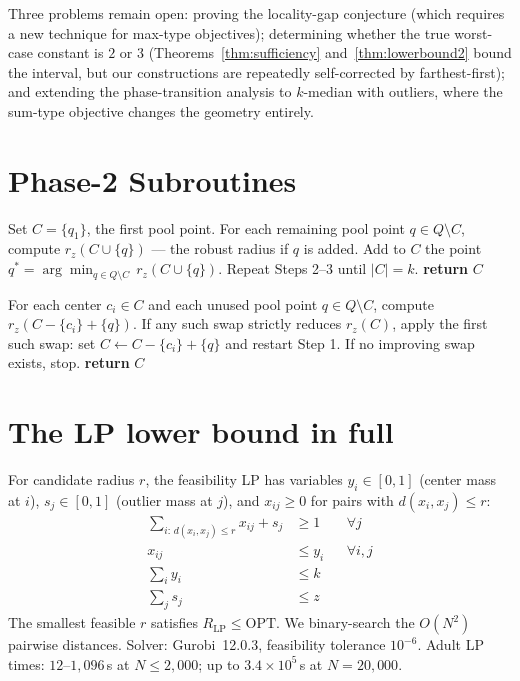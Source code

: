\documentclass[twoside,leqno,twocolumn]{article}
\newcommand{\OPT}{\mathrm{OPT}}
\begin{document}
Three problems remain open: proving the locality-gap conjecture
(which requires a new technique for max-type objectives); determining
whether the true worst-case constant is $2$ or $3$
(Theorems~\ref{thm:sufficiency} and~\ref{thm:lowerbound2} bound the
interval, but our constructions are repeatedly self-corrected by
farthest-first); and extending the phase-transition analysis to
$k$-median with outliers, where the sum-type objective changes the
geometry entirely.


\appendix
\section{Phase-2 Subroutines}
\label{app:pseudocode}

\begin{algorithm}[t]
\caption{OC-Forward$(X, Q, k, z)$}
\label{alg:ocforward}
\begin{algorithmic}[1]
\STATE Set $C = \{q_1\}$, the first pool point.
\STATE For each remaining pool point $q \in Q \setminus C$, compute
       $r_z(C \cup \{q\})$ --- the robust radius if $q$ is added.
\STATE Add to $C$ the point $q^* = \arg\min_{q \in Q \setminus C}\,
       r_z(C \cup \{q\})$.
\STATE Repeat Steps 2--3 until $|C| = k$.
\STATE \textbf{return} $C$
\end{algorithmic}
\end{algorithm}

\begin{algorithm}[t]
\caption{OC-Local$(X, Q, C, z)$}
\label{alg:oclocal}
\begin{algorithmic}[1]
\STATE For each center $c_i \in C$ and each unused pool point
       $q \in Q \setminus C$, compute $r_z(C - \{c_i\} + \{q\})$.
\STATE If any such swap strictly reduces $r_z(C)$, apply the first
       such swap: set $C \leftarrow C - \{c_i\} + \{q\}$ and
       restart Step 1.
\STATE If no improving swap exists, stop.
\STATE \textbf{return} $C$
\end{algorithmic}
\end{algorithm}

\section{The LP lower bound in full}
\label{app:lp}

For candidate radius $r$, the feasibility LP has variables
$y_i\in[0,1]$ (center mass at $i$), $s_j\in[0,1]$ (outlier mass
at $j$), and $x_{ij}\ge0$ for pairs with $d(x_i,x_j)\le r$:
\[
\begin{aligned}
  \textstyle\sum_{i:\,d(x_i,x_j)\le r}x_{ij}+s_j&\ge1 &&\forall j\\
  x_{ij}&\le y_i &&\forall i,j\\
  \textstyle\sum_i y_i&\le k\\
  \textstyle\sum_j s_j&\le z
\end{aligned}
\]
The smallest feasible $r$ satisfies $R_\mathrm{LP}\le\OPT$. We
binary-search the $O(N^2)$ pairwise distances. Solver: Gurobi~12.0.3,
feasibility tolerance $10^{-6}$. Adult LP times: $12$--$1{,}096$\,s at
$N\le2{,}000$; up to $3.4\times10^5$\,s at $N=20{,}000$.



\end{document}
